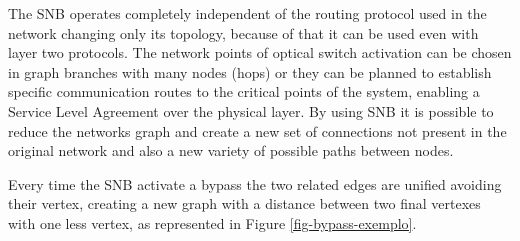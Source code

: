 \documentclass[conference]{IEEEtran}
\begin{document}
The SNB operates completely independent of the routing protocol used in the network changing only its topology, because of that it can be used even with layer two protocols. The network points of optical switch activation can be chosen in graph branches with many nodes (hops) or they can be planned to establish specific communication routes to the critical points of the system, enabling a Service Level Agreement over the physical layer. By using SNB it is possible to reduce the networks graph and create a new set of connections not present in the original network and also a new variety of possible paths between nodes.

Every time the SNB activate a bypass the two related edges are unified avoiding their vertex, creating a new graph with a distance between two final vertexes with one less vertex, as represented in Figure \ref{fig-bypass-exemplo}.
\end{document}
